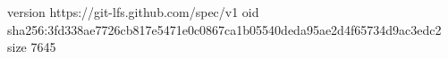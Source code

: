 version https://git-lfs.github.com/spec/v1
oid sha256:3fd338ae7726cb817e5471e0c0867ca1b05540deda95ae2d4f65734d9ac3edc2
size 7645
